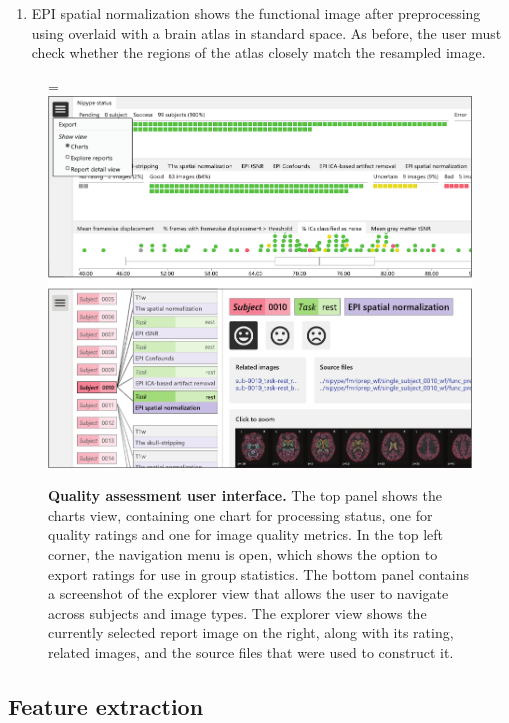 \begin{enumerate}
\item

EPI spatial normalization shows the functional image after preprocessing using  overlaid with a brain atlas in standard space. As before, the user must check whether the regions of the atlas closely match the resampled image.

\end{enumerate}

\begin{figure}[!tb]
    \begin{adjustwidth}{-1cm}{}
        \hsize=\linewidth%
        \includegraphics[width=\linewidth]{./fig/quality-assessment/quality-assessment-crop.pdf}
        \caption{\textbf{Quality assessment user interface.} The top panel shows the charts view, containing one chart for processing status, one for quality ratings and one for image quality metrics. In the top left corner, the navigation menu is open, which shows the option to export ratings for use in group statistics. The bottom panel contains a screenshot of the explorer view that allows the user to navigate across
        subjects and image types. The explorer view shows the currently selected report image on the right, along with its rating, related images, and the source files that were used to construct it.}\label{fig:qa}
    \end{adjustwidth}
\end{figure}

\subsection{Feature extraction}\label{sec:featureextraction}

